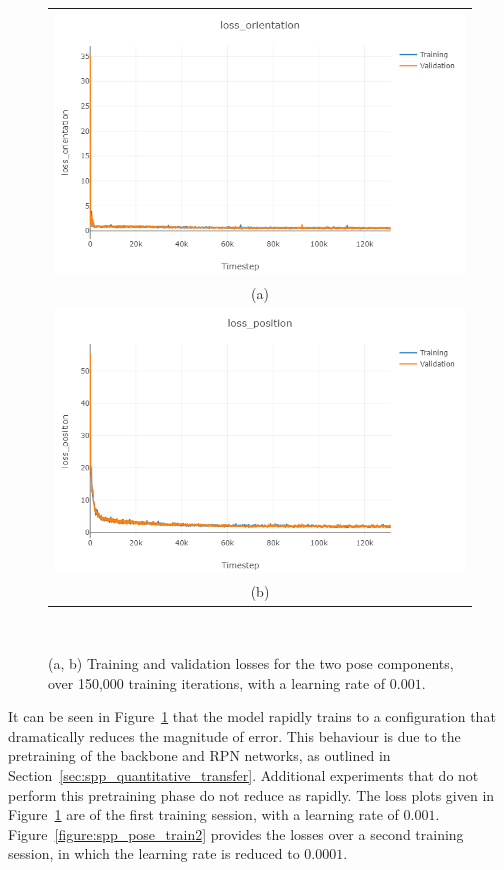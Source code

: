 \begin{figure}[!htbp]
  \centering
  \begin{tabular}{c}
    \includegraphics[width=.8\linewidth]{figures/spp/quant/pose/rot.png}\\
    (a)\\
		\includegraphics[width=.8\linewidth]{figures/spp/quant/pose/pos.png}\\
    (b)
  \end{tabular}
  \caption[VKITTI Pose Training]
  {
    (a, b) Training and validation losses for the two pose components, over 150,000 training 
    iterations, with a learning rate of \( 0.001 \).
  }
~\label{figure:spp_pose_train}
\end{figure}

It can be seen in Figure~\ref{figure:spp_pose_train} that the model rapidly trains to a configuration that dramatically 
reduces the magnitude of error. This behaviour is due to the pretraining of the backbone and RPN networks, as outlined 
in Section~\ref{sec:spp_quantitative_transfer}. Additional experiments that do not perform this pretraining phase do not 
reduce as rapidly. The loss plots given in Figure~\ref{figure:spp_pose_train} are of the first training session, with a 
learning rate of \( 0.001 \). Figure~\ref{figure:spp_pose_train2} provides the losses over a second training session, in 
which the learning rate is reduced to \( 0.0001 \).

